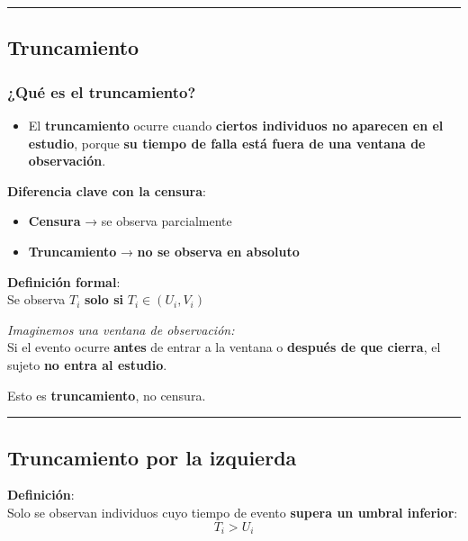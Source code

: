 \documentclass[
  letterpaper,
  DIV=11,
  numbers=noendperiod]{scrartcl}
\providecommand{\tightlist}{%
  \setlength{\itemsep}{0pt}\setlength{\parskip}{0pt}}
\begin{document}
\begin{center}\rule{0.5\linewidth}{0.5pt}\end{center}

\subsection{Truncamiento}\label{truncamiento}

\subsubsection{¿Qué es el
truncamiento?}\label{quuxe9-es-el-truncamiento-1}

\begin{itemize}
\tightlist
\item
  El \textbf{truncamiento} ocurre cuando \textbf{ciertos individuos no
  aparecen en el estudio}, porque \textbf{su tiempo de falla está fuera
  de una ventana de observación}.
\end{itemize}

\textbf{Diferencia clave con la censura}:

\begin{itemize}
\tightlist
\item
  \textbf{Censura} → se observa parcialmente
\item
  \textbf{Truncamiento} → \textbf{no se observa en absoluto}
\end{itemize}

\textbf{Definición formal}:\\
Se observa \(T_i\) \textbf{solo si} \(T_i \in (U_i, V_i)\)

\emph{Imaginemos una ventana de observación:}\\
Si el evento ocurre \textbf{antes} de entrar a la ventana o
\textbf{después de que cierra}, el sujeto \textbf{no entra al estudio}.

Esto es \textbf{truncamiento}, no censura.

\begin{center}\rule{0.5\linewidth}{0.5pt}\end{center}

\subsection{Truncamiento por la
izquierda}\label{truncamiento-por-la-izquierda}

\textbf{Definición}:\\
Solo se observan individuos cuyo tiempo de evento \textbf{supera un
umbral inferior}:\\
\[
T_i > U_i
\]
\end{document}
